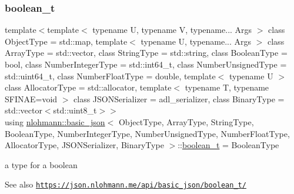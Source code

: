 \subsubsection{\texorpdfstring{boolean\+\_\+t}{boolean\_t}}
{\footnotesize\ttfamily template$<$template$<$ typename U, typename V, typename... Args $>$ class Object\+Type = std\+::map, template$<$ typename U, typename... Args $>$ class Array\+Type = std\+::vector, class String\+Type  = std\+::string, class Boolean\+Type  = bool, class Number\+Integer\+Type  = std\+::int64\+\_\+t, class Number\+Unsigned\+Type  = std\+::uint64\+\_\+t, class Number\+Float\+Type  = double, template$<$ typename U $>$ class Allocator\+Type = std\+::allocator, template$<$ typename T, typename S\+F\+I\+N\+A\+E=void $>$ class J\+S\+O\+N\+Serializer = adl\+\_\+serializer, class Binary\+Type  = std\+::vector$<$std\+::uint8\+\_\+t$>$$>$ \\
using \hyperlink{classnlohmann_1_1basic__json}{nlohmann\+::basic\+\_\+json}$<$ Object\+Type, Array\+Type, String\+Type, Boolean\+Type, Number\+Integer\+Type, Number\+Unsigned\+Type, Number\+Float\+Type, Allocator\+Type, J\+S\+O\+N\+Serializer, Binary\+Type $>$\+::\hyperlink{classnlohmann_1_1basic__json_a44fd1a12c9c54623c942b430e7a72937}{boolean\+\_\+t} =  Boolean\+Type}



a type for a boolean 

\begin{DoxySeeAlso}{See also}
\href{https://json.nlohmann.me/api/basic_json/boolean_t/}{\tt https\+://json.\+nlohmann.\+me/api/basic\+\_\+json/boolean\+\_\+t/} 
\end{DoxySeeAlso}
\mbox{\label{classnlohmann_1_1basic__json_a5b8abaebd922d82d69756327c0c347e6}} 
